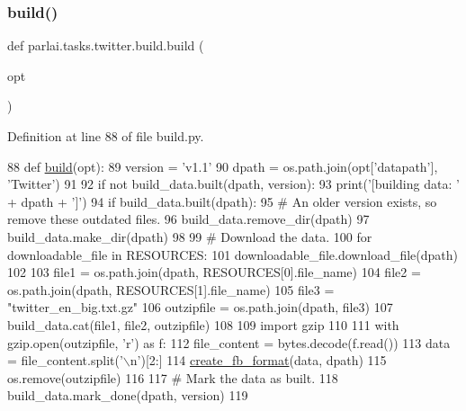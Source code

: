 \subsubsection{\texorpdfstring{build()}{build()}}
{\footnotesize\ttfamily def parlai.\+tasks.\+twitter.\+build.\+build (\begin{DoxyParamCaption}\item[{}]{opt }\end{DoxyParamCaption})}



Definition at line 88 of file build.\+py.


\begin{DoxyCode}
88 \textcolor{keyword}{def }\hyperlink{namespacedialog__babi__feedback_1_1build_a7a9d289f7493a5ded13c4b7f071b6184}{build}(opt):
89     version = \textcolor{stringliteral}{'v1.1'}
90     dpath = os.path.join(opt[\textcolor{stringliteral}{'datapath'}], \textcolor{stringliteral}{'Twitter'})
91 
92     \textcolor{keywordflow}{if} \textcolor{keywordflow}{not} build\_data.built(dpath, version):
93         print(\textcolor{stringliteral}{'[building data: '} + dpath + \textcolor{stringliteral}{']'})
94         \textcolor{keywordflow}{if} build\_data.built(dpath):
95             \textcolor{comment}{# An older version exists, so remove these outdated files.}
96             build\_data.remove\_dir(dpath)
97         build\_data.make\_dir(dpath)
98 
99         \textcolor{comment}{# Download the data.}
100         \textcolor{keywordflow}{for} downloadable\_file \textcolor{keywordflow}{in} RESOURCES:
101             downloadable\_file.download\_file(dpath)
102 
103         file1 = os.path.join(dpath, RESOURCES[0].file\_name)
104         file2 = os.path.join(dpath, RESOURCES[1].file\_name)
105         file3 = \textcolor{stringliteral}{"twitter\_en\_big.txt.gz"}
106         outzipfile = os.path.join(dpath, file3)
107         build\_data.cat(file1, file2, outzipfile)
108 
109         \textcolor{keyword}{import} gzip
110 
111         with gzip.open(outzipfile, \textcolor{stringliteral}{'r') as f:}
112 \textcolor{stringliteral}{            file\_content = bytes.decode(f.read())}
113 \textcolor{stringliteral}{        data = file\_content.split('\(\backslash\)n'})[2:]
114         \hyperlink{namespaceparlai_1_1tasks_1_1wikiqa_1_1build_a554828702769592403db58c955d1dfe3}{create\_fb\_format}(data, dpath)
115         os.remove(outzipfile)
116 
117         \textcolor{comment}{# Mark the data as built.}
118         build\_data.mark\_done(dpath, version)
119 \end{DoxyCode}
\mbox{\label{namespaceparlai_1_1tasks_1_1twitter_1_1build_ab36b25b09bea28cdf3278f910e5e9ff6}} 
